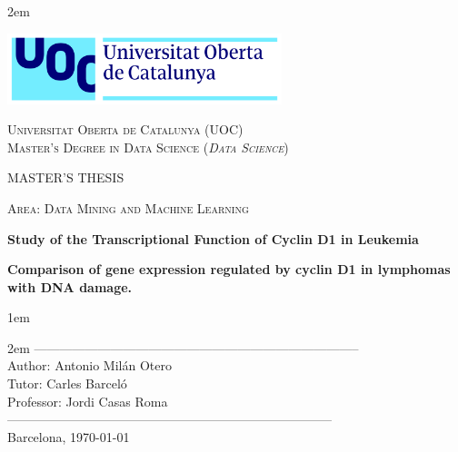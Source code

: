 \newpage
\thispagestyle{empty}

\baselineskip 2em


\centerline{\includegraphics[width=0.6\textwidth]{../images/UOC-logo}}
\begin{center}
\textsc{Universitat Oberta de Catalunya (UOC) \\
 Master's Degree in Data Science (\textit{Data Science})\\}


\vspace*{1.5cm}

\textsc{\Large MASTER'S THESIS}

\vspace*{0.5cm}

\textsc{\large Area: Data Mining and Machine Learning}



\vspace*{2.0cm}

\textbf{\Large Study of the Transcriptional Function of Cyclin D1 in Leukemia}

\textbf{\large Comparison of gene expression regulated by cyclin D1 in lymphomas with DNA damage.}

\vspace{2.5cm}
\baselineskip 1em

\baselineskip 2em
-----------------------------------------------------------------------------\\
Author:     Antonio Milán Otero\\
Tutor:      Carles Barceló\\
Professor:  Jordi Casas Roma\\
-----------------------------------------------------------------------------\\
\vspace*{1.5cm}
Barcelona, \today

\end{center}

\newpage
\pagestyle{empty}
\hfill
